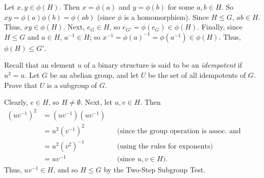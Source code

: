 \begin{solution}[print=true]
Let $x,y\in \phi(H)$.  Then $x=\phi(a)$ and $y=\phi(b)$ for some $a,b\in H$.  So $xy=\phi(a)\phi(b)=\phi(ab)$ (since $\phi$ is a homomorphism).  Since $H\leq G$, $ab\in H$.  Thus, $xy\in \phi(H)$.  Next, $e_G\in H$, so $e_{G'}=\phi(e_G)\in \phi(H)$. Finally, since $H\leq G$ and $a\in H$, $a^{-1}\in H$; so $x^{-1}=\phi(a)^{-1}=\phi(a^{-1}) \in \phi(H)$. Thus, $\phi(H)\leq G'$.

\end{solution}

\begin{exercise}[ID=4D, subtitle=(Extra Credit)]
Recall that an element $u$ of a binary structure is said to be an \textit{idempotent} if $u^2=u$.  Let $G$ be an abelian group, and let $U$ be the set of all idempotents of $G$.  Prove that $U$ is a subgroup of $G$.
\end{exercise}

\begin{solution}[print=true]
Clearly, $e\in H$, so $H\neq \emptyset$.  Next, let $u,v\in H$. Then
\begin{align*}(uv^{-1})^2&=(uv^{-1})(uv^{-1})&&\\
&=u^2(v^{-1})^2 &&\text{(since the group operation is assoc. and comm.)}\\
&=u^2(v^2)^{-1} &&\text{(using the rules for exponents)}\\
&=uv^{-1}&&\text{(since $u,v\in H$).}
\end{align*}
Thus, $uv^{-1}\in H$, and so $H \leq G$ by the Two-Step Subgroup Test. \end{solution}

